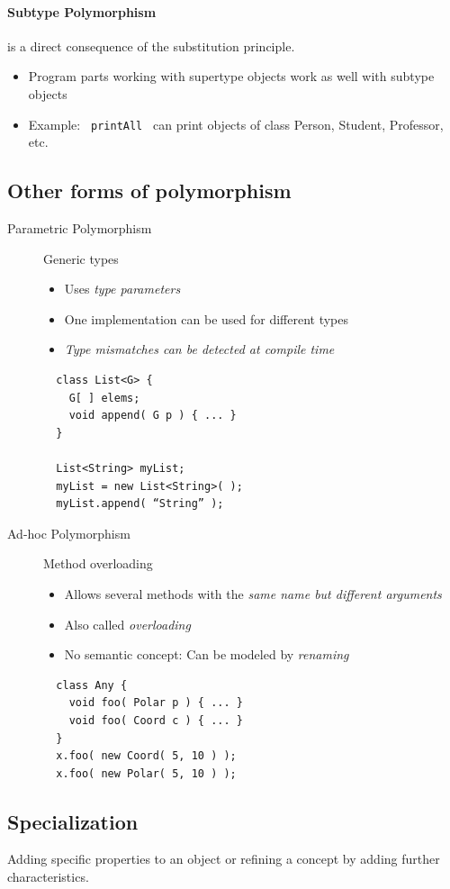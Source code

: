 \paragraph{Subtype Polymorphism} is a direct consequence of the substitution principle.
\begin{itemize}
 \item Program parts working with supertype objects work as well with subtype objects
 \item Example: \lstinline{ printAll } can print objects of class Person, Student, Professor, etc.
\end{itemize}
\subsection{Other forms of polymorphism}
\begin{description}
 \item[Parametric Polymorphism] Generic types
  \begin{itemize}
   \item Uses \emph{type parameters}
   \item One implementation can be used for different types
   \item \emph{Type mismatches can be detected at compile time}
  \end{itemize}
  \lstset{language=Java}
  \begin{lstlisting}
  class List<G> {
    G[ ] elems;
    void append( G p ) { ... }
  }
  
  List<String> myList;
  myList = new List<String>( );
  myList.append( “String” );
  \end{lstlisting}
 \item[Ad-hoc Polymorphism] Method overloading
  \begin{itemize}
   \item Allows several methods with the \emph{same name but different arguments}
   \item Also called \emph{overloading}
   \item No semantic concept: Can be modeled by \emph{renaming}
  \end{itemize}
  \begin{lstlisting}
  class Any {
    void foo( Polar p ) { ... }
    void foo( Coord c ) { ... }
  }
  x.foo( new Coord( 5, 10 ) );
  x.foo( new Polar( 5, 10 ) );
  \end{lstlisting}
\end{description}

\subsection{Specialization}
\begin{definition}
 Adding specific properties to an object or refining a concept by adding further characteristics.
\end{definition}



